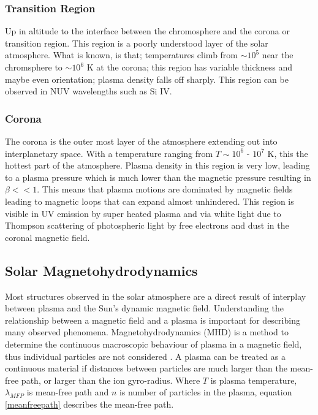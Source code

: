 \subsubsection{Transition Region}
Up in altitude to the interface between the chromosphere and the corona or transition region. This region is a poorly understood layer of the solar atmosphere. What is known, is that; temperatures climb from $\sim10^{5}$ near the chromsphere to $\sim10^{6}$ K at the corona; this region has variable thickness and maybe even orientation; plasma density falls off sharply. This region can be observed in NUV wavelengths such as Si IV.  

\subsubsection{Corona}
The corona is the outer most layer of the atmosphere extending out into interplanetary space.  With a temperature ranging from $T\sim10^{6}$ - $10^{7}$ K, this the hottest part of the atmosphere. Plasma density in this region is very low, leading to a plasma pressure which is much lower than the magnetic pressure resulting in $\beta << 1$. This means that plasma motions are dominated by magnetic fields leading to magnetic loops that can expand almost unhindered. This region is visible in UV emission by super heated plasma and via white light due to Thompson scattering of photospheric light by free electrons and dust in the coronal magnetic field. 



\subsection{Solar Magnetohydrodynamics}\label{MHD}
Most structures observed in the solar atmosphere are a direct result of interplay between plasma and the Sun's dynamic magnetic field. Understanding the relationship between a magnetic field and a plasma is important for describing many observed phenomena. Magnetohydrodynamics (MHD) is a method to determine the continuous macroscopic behaviour of plasma in a magnetic field, thus individual particles are not considered \citep{1982soma.book.....P}. A plasma can be treated as a continuous material if distances between particles are much larger than the mean-free path, or larger than the ion gyro-radius. Where $T$ is plasma temperature, $\lambda_{MFP}$ is mean-free path and $n$ is number of particles in the plasma, equation \ref{meanfreepath} describes the mean-free path. 

